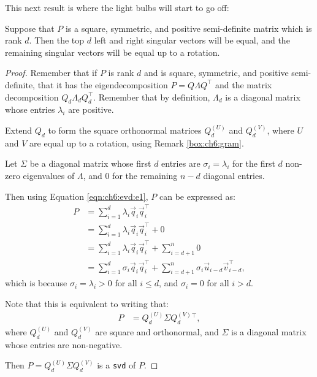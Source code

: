 This next result is where the light bulbs will start to go off:
\begin{corollary}
Suppose that $P$ is a square, symmetric, and positive semi-definite matrix which is rank $d$. Then the top $d$ left and right singular vectors will be equal, and the remaining singular vectors will be equal up to a rotation.
\end{corollary}
\begin{proof}
Remember that if $P$ is rank $d$ and is square, symmetric, and positive semi-definite, that it has the eigendecomposition $P = Q\Lambda Q^\top$ and the matrix decomposition $Q_d \Lambda_d Q_d^\top$. Remember that by definition, $\Lambda_d$ is a diagonal matrix whose entries $\lambda_i$ are positive. 

Extend $Q_d$ to form the square orthonormal matrices $Q_d^{(U)}$ and $Q_d^{(V)}$, where $U$ and $V$ are equal up to a rotation, using Remark \ref{box:ch6:gram}.

Let $\Sigma$ be a diagonal matrix whose first $d$ entries are $\sigma_i = \lambda_i$ for the first $d$ non-zero eigenvalues of $\Lambda$, and $0$ for the remaining $n - d$ diagonal entries.

Then using Equation \eqref{eqn:ch6:evd:e1}, $P$ can be expressed as:
\begin{align*}
    P &= \sum_{i = 1}^d \lambda_i \vec q_i \vec q_i^\top \\
    &= \sum_{ i =1}^d \lambda_i \vec q_i \vec q_i^\top + 0 \\
    &= \sum_{i = 1}^d \lambda_i \vec q_i \vec q_i^\top + \sum_{i = d + 1}^n 0 \\
    &= \sum_{i = 1}^d \sigma_i \vec q_i \vec q_i^\top + \sum_{i = d + 1}^n \sigma_i \vec u_{i - d}\vec v_{i - d}^\top,
\end{align*}
which is because $\sigma_i = \lambda_i > 0$ for all $i \leq d$, and $\sigma_i = 0$ for all $i > d$. 

Note that this is equivalent to writing that:
\begin{align*}
    P &= Q_d^{(U)}\Sigma Q_d^{(V)}^\top,
\end{align*}
where $Q_d^{(U)}$ and $Q_d^{(V)}$ are square and orthonormal, and $\Sigma$ is a diagonal matrix whose entries are non-negative.

Then $P = Q_d^{(U)}\Sigma Q_d^{(V)}$ is a \texttt{svd} of $P$. 
\end{proof}